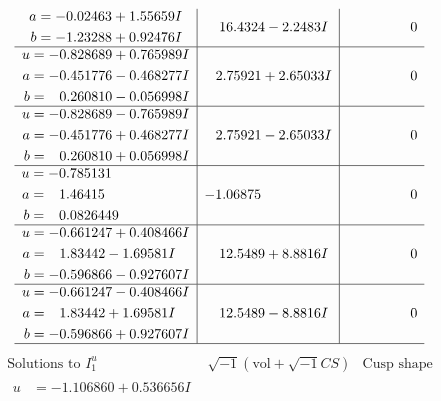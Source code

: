 \documentclass[1p]{elsarticle_modified}
\theoremstyle{definition}
\newcommand{\I}{\sqrt{-1}}
\begin{document}
$$\begin{array}{c|c|c}
\begin{aligned}
a &= -0.02463 + 1.55659 I \\
b &= -1.23288 + 0.92476 I\end{aligned}
 & \phantom{-}16.4324 - 2.2483 I & \phantom{-0.000000 } 0 \\ \hline\begin{aligned}
u &= -0.828689 + 0.765989 I \\
a &= -0.451776 - 0.468277 I \\
b &= \phantom{-}0.260810 - 0.056998 I\end{aligned}
 & \phantom{-}2.75921 + 2.65033 I & \phantom{-0.000000 } 0 \\ \hline\begin{aligned}
u &= -0.828689 - 0.765989 I \\
a &= -0.451776 + 0.468277 I \\
b &= \phantom{-}0.260810 + 0.056998 I\end{aligned}
 & \phantom{-}2.75921 - 2.65033 I & \phantom{-0.000000 } 0 \\ \hline\begin{aligned}
u &= -0.785131\phantom{ +0.000000I} \\
a &= \phantom{-}1.46415\phantom{ +0.000000I} \\
b &= \phantom{-}0.0826449\phantom{ +0.000000I}\end{aligned}
 & -1.06875\phantom{ +0.000000I} & \phantom{-0.000000 } 0 \\ \hline\begin{aligned}
u &= -0.661247 + 0.408466 I \\
a &= \phantom{-}1.83442 - 1.69581 I \\
b &= -0.596866 - 0.927607 I\end{aligned}
 & \phantom{-}12.5489 + 8.8816 I & \phantom{-0.000000 } 0 \\ \hline\begin{aligned}
u &= -0.661247 - 0.408466 I \\
a &= \phantom{-}1.83442 + 1.69581 I \\
b &= -0.596866 + 0.927607 I\end{aligned}
 & \phantom{-}12.5489 - 8.8816 I & \phantom{-0.000000 } 0\\
 \hline 
 \end{array}$$\newpage$$\begin{array}{c|c|c}  
\text{Solutions to }I^u_{1}& \I (\text{vol} + \sqrt{-1}CS) & \text{Cusp shape}\\
 \hline 
\begin{aligned}
u &= -1.106860 + 0.536656 I \\

\end{aligned}
\end{array}$$
\end{document}
